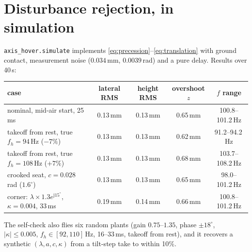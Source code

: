 \documentclass[11pt]{article}
\newcommand{\jj}{\mathrm{j}}
\begin{document}
\section{Disturbance rejection, in simulation}
\label{sec:sim}
\texttt{axis\_hover.simulate} implements \eqref{eq:precession}--\eqref{eq:translation} with ground
contact, measurement noise ($0.034$\,mm, $0.0039$\,rad) and a pure delay. Results over 40\,s:
\begin{center}\begin{tabular}{lcccc}
\toprule
case & lateral RMS & height RMS & overshoot $z$ & $f$ range \\ \midrule
nominal, mid-air start, 25\,ms & 0.13\,mm & 0.13\,mm & 0.65\,mm & 100.8--101.2\,Hz \\
takeoff from rest, true $f_h=94$\,Hz ($-7\%$) & 0.13\,mm & 0.13\,mm & 0.62\,mm & 91.2--94.2\,Hz \\
takeoff from rest, true $f_h=108$\,Hz ($+7\%$) & 0.13\,mm & 0.13\,mm & 0.68\,mm & 103.7--108.2\,Hz \\
crooked seat, $c=0.028$\,rad ($1.6^\circ$) & 0.13\,mm & 0.13\,mm & 0.65\,mm & 98.0--101.2\,Hz \\
corner: $\lambda\times1.3e^{\jj15^\circ}$, $\kappa=0.004$, 33\,ms & 0.19\,mm & 0.14\,mm & 0.66\,mm & 100.8--101.2\,Hz \\
\bottomrule
\end{tabular}\end{center}
The self-check also flies six random plants (gain $0.75$--$1.35$, phase $\pm18^\circ$,
$|\kappa|\le0.005$, $f_h\in[92,110]$\,Hz, 16--33\,ms, takeoff from rest), and it recovers a
synthetic $(\lambda,a,c,\kappa)$ from a tilt-step take to within 10\%.
\end{document}
